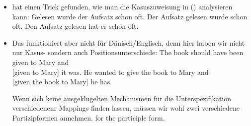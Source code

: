 









\begin{itemize}
\item \citet{Meurers99b} hat einen Trick gefunden, wie man die Kasuszuweisung in ()
  analysieren kann:
\nocite{Meurers2000b,MdK2001a}
\eal
\ex 
Gelesen wurde der Aufsatz schon oft.
\ex 
Der Aufsatz gelesen wurde schon oft.
\ex
Den Aufsatz gelesen hat er schon oft.
\zl

\item Das funktioniert aber nicht für Dänisch/Englisch, denn hier haben wir nicht nur Kasus- sondern
  auch Positionsunterschiede:
\eal
\ex The book should have been given to Mary and\\
    {}[given to Mary] it was.
\ex He wanted to give the book to Mary and\\
    {}[given the book to Mary] he has.
\zl

Wenn sich keine ausgeklügelten Mechanismen für die Unterspezifikation verschiedenenr Mappings finden
lassen, müssen wir wohl zwei verschiedene Partizipformen annehmen.
for the participle form.
\end{itemize}










